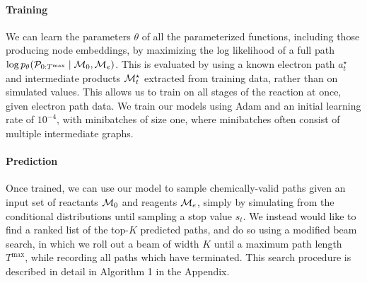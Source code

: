 \paragraph{Training}
We can learn the parameters $\theta$ of all the parameterized functions, including those producing node embeddings, by maximizing the log likelihood of a full path $\log p_\theta({\mathcal{P}}_{0:T^{\mathrm{max}}} \mid {\mathcal{M}}_0, {\mathcal{M}}_e)$.
This is evaluated by using a known electron path $a_t^\star$ and intermediate products ${\mathcal{M}}_t^\star$ extracted from training data,
rather than on simulated values. 
This allows us to train on all stages of the reaction at once, given electron path data.
We train our models using Adam \citep{kingma2014adam} and an initial learning rate of $10^{-4}$,
with minibatches of size one, where minibatches often consist of multiple intermediate graphs.

\paragraph{Prediction}
Once trained, we can use our model to sample chemically-valid paths given an input set of reactants ${\mathcal{M}}_0$ and reagents ${\mathcal{M}}_e$, 
simply by simulating from the conditional distributions until sampling a stop value $s_t$.
We instead would like to find a ranked list of the top-$K$ predicted paths, and do so using a modified beam search,
in which we roll out a beam of width $K$ until a maximum path length $T^\mathrm{max}$,
while recording all paths which have terminated.
This search procedure is described in detail in Algorithm 1 in the Appendix.



